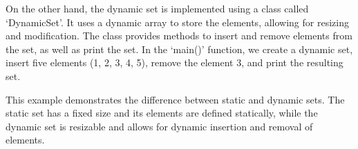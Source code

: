 \begin{solution}
    On the other hand, the dynamic set is implemented using a class called `DynamicSet'. It uses a dynamic array to store the elements, allowing for resizing and modification. The class provides methods to insert and remove elements from the set, as well as print the set. In the `main()' function, we create a dynamic set, insert five elements (1, 2, 3, 4, 5), remove the 
    element 3, and print the resulting set.

    This example demonstrates the difference between static and dynamic sets. The static set has a fixed size and its elements are defined statically, while the dynamic set is resizable and allows for dynamic insertion and removal of elements.
\end{solution}